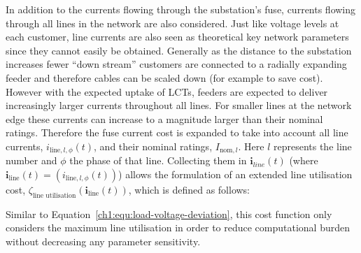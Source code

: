 In addition to the currents flowing through the substation's fuse, currents flowing through all lines in the network are also considered.
Just like voltage levels at each customer, line currents are also seen as theoretical key network parameters since they cannot easily be obtained.
Generally as the distance to the substation increases fewer ``down stream'' customers are connected to a radially expanding feeder and therefore cables can be scaled down (for example to save cost).
However with the expected uptake of LCTs, feeders are expected to deliver increasingly larger currents throughout all lines.
For smaller lines at the network edge these currents can increase to a magnitude larger than their nominal ratings.
Therefore the fuse current cost is expanded to take into account all line currents, $i_{\text{line},l,\phi}(t)$, and their nominal ratings, $I_{\text{nom}, l}$.
Here $l$ represents the line number and $\phi$ the phase of that line.
Collecting them in $\textbf{i}_{line}(t)$ (where $\textbf{i}_\text{line}(t) = (i_{\text{line},l,\phi}(t))$) allows the formulation of an extended line utilisation cost, $\zeta_\text{line utilisation}(\textbf{i}_\text{line}(t))$, which is defined as follows:



Similar to Equation~\ref{ch1:equ:load-voltage-deviation}, this cost function only considers the maximum line utilisation in order to reduce computational burden without decreasing any parameter sensitivity.
